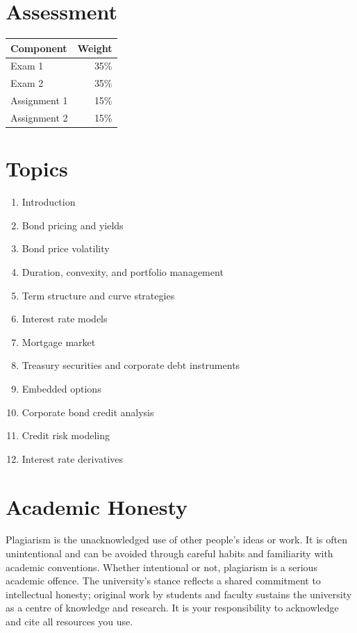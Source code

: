 \documentclass[
  letterpaper,
  DIV=11,
  numbers=noendperiod]{scrartcl}
\providecommand{\tightlist}{%
  \setlength{\itemsep}{0pt}\setlength{\parskip}{0pt}}
\begin{document}
\section{Assessment}\label{assessment}

\begin{longtable}[]{@{}lr@{}}
\toprule\noalign{}
Component & Weight \\
\midrule\noalign{}
\endhead
\bottomrule\noalign{}
\endlastfoot
Exam 1 & 35\% \\
Exam 2 & 35\% \\
Assignment 1 & 15\% \\
Assignment 2 & 15\% \\
\end{longtable}

\section{Topics}\label{topics}

\begin{enumerate}
\def\labelenumi{\arabic{enumi}.}
\tightlist
\item
  Introduction
\item
  Bond pricing and yields
\item
  Bond price volatility
\item
  Duration, convexity, and portfolio management
\item
  Term structure and curve strategies
\item
  Interest rate models
\item
  Mortgage market
\item
  Treasury securities and corporate debt instruments
\item
  Embedded options
\item
  Corporate bond credit analysis
\item
  Credit risk modeling
\item
  Interest rate derivatives
\end{enumerate}

\section{Academic Honesty}\label{academic-honesty}

Plagiarism is the unacknowledged use of other people's ideas or work. It
is often unintentional and can be avoided through careful habits and
familiarity with academic conventions. Whether intentional or not,
plagiarism is a serious academic offence. The university's stance
reflects a shared commitment to intellectual honesty; original work by
students and faculty sustains the university as a centre of knowledge
and research. It is your responsibility to acknowledge and cite all
resources you use.
\end{document}
